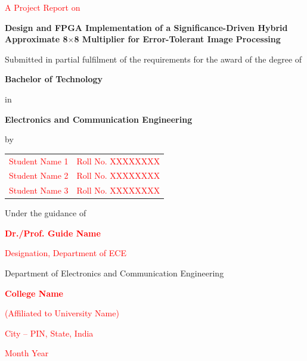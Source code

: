 \documentclass[12pt,a4paper,oneside]{report}
\newcommand{\placeholder}[1]{\textcolor{red}{#1}}
\begin{document}
\begin{titlepage}
\centering
{\large \placeholder{A Project Report on}\par}
\vspace{0.8cm}
{\LARGE\bfseries Design and FPGA Implementation of a Significance-Driven Hybrid Approximate 8$\times$8 Multiplier for Error-Tolerant Image Processing\par}
\vspace{1cm}
{\large Submitted in partial fulfilment of the requirements for the award of the degree of\par}
\vspace{0.3cm}
{\Large\bfseries Bachelor of Technology\par}
{\large in\par}
{\Large\bfseries Electronics and Communication Engineering\par}
\vspace{1cm}
{\large by\par}
\vspace{0.3cm}
\begin{tabular}{ll}
\placeholder{Student Name 1} & \placeholder{Roll No. XXXXXXXX} \\
\placeholder{Student Name 2} & \placeholder{Roll No. XXXXXXXX} \\
\placeholder{Student Name 3} & \placeholder{Roll No. XXXXXXXX} \\
\end{tabular}
\vspace{1cm}

{\large Under the guidance of\par}
{\large\bfseries \placeholder{Dr./Prof. Guide Name}\par}
{\placeholder{Designation, Department of ECE}\par}
\vfill
{\large Department of Electronics and Communication Engineering\par}
{\large\bfseries \placeholder{College Name}\par}
{\placeholder{(Affiliated to University Name)}\par}
{\placeholder{City -- PIN, State, India}\par}
\vspace{0.3cm}
{\large \placeholder{Month Year}\par}
\end{titlepage}

\setcounter{page}{2}
\end{document}
